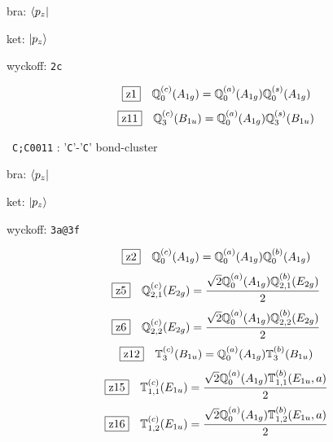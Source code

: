 \documentclass[fleqn,10pt,landscape]{jsarticle}
\begin{document}
\noindent\quad * bra: $\bra{p_{z}}$

\noindent\quad * ket: $\ket{p_{z}}$

\noindent\quad * wyckoff: \texttt{2c}

\begin{dmath*}
\hspace*{3mm}\fbox{z1}\quad \mathbb{Q}_{0}^{(c)}(A_{1g})=\mathbb{Q}_{0}^{(a)}(A_{1g}) \mathbb{Q}_{0}^{(s)}(A_{1g})
\end{dmath*}
\begin{dmath*}
\hspace*{3mm}\fbox{z11}\quad \mathbb{Q}_{3}^{(c)}(B_{1u})=\mathbb{Q}_{0}^{(a)}(A_{1g}) \mathbb{Q}_{3}^{(s)}(B_{1u})
\end{dmath*}
\vspace{5mm}

\noindent\textbullet\, \texttt{C;C\texttt{}001\texttt{}1} : '\texttt{C}'-'\texttt{C}' bond-cluster

\noindent\quad * bra: $\bra{p_{z}}$

\noindent\quad * ket: $\ket{p_{z}}$

\noindent\quad * wyckoff: \texttt{3a@3f}

\begin{dmath*}
\hspace*{3mm}\fbox{z2}\quad \mathbb{Q}_{0}^{(c)}(A_{1g})=\mathbb{Q}_{0}^{(a)}(A_{1g}) \mathbb{Q}_{0}^{(b)}(A_{1g})
\end{dmath*}
\begin{dmath*}
\hspace*{3mm}\fbox{z5}\quad \mathbb{Q}_{2,1}^{(c)}(E_{2g})=\frac{\sqrt{2} \mathbb{Q}_{0}^{(a)}(A_{1g}) \mathbb{Q}_{2,1}^{(b)}(E_{2g})}{2}
\end{dmath*}
\begin{dmath*}
\hspace*{3mm}\fbox{z6}\quad \mathbb{Q}_{2,2}^{(c)}(E_{2g})=\frac{\sqrt{2} \mathbb{Q}_{0}^{(a)}(A_{1g}) \mathbb{Q}_{2,2}^{(b)}(E_{2g})}{2}
\end{dmath*}
\begin{dmath*}
\hspace*{3mm}\fbox{z12}\quad \mathbb{T}_{3}^{(c)}(B_{1u})=\mathbb{Q}_{0}^{(a)}(A_{1g}) \mathbb{T}_{3}^{(b)}(B_{1u})
\end{dmath*}
\begin{dmath*}
\hspace*{3mm}\fbox{z15}\quad \mathbb{T}_{1,1}^{(c)}(E_{1u})=\frac{\sqrt{2} \mathbb{Q}_{0}^{(a)}(A_{1g}) \mathbb{T}_{1,1}^{(b)}(E_{1u},a)}{2}
\end{dmath*}
\begin{dmath*}
\hspace*{3mm}\fbox{z16}\quad \mathbb{T}_{1,2}^{(c)}(E_{1u})=\frac{\sqrt{2} \mathbb{Q}_{0}^{(a)}(A_{1g}) \mathbb{T}_{1,2}^{(b)}(E_{1u},a)}{2}
\end{dmath*}
\vspace{5mm}
\end{document}
